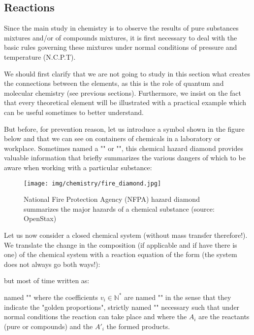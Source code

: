 	\subsection{Reactions}\label{chemical reactions}
	Since the main study in chemistry is to observe the results of pure substances mixtures and/or of compounds mixtures, it is first necessary to deal with  the basic rules governing these mixtures under normal conditions of pressure and temperature (N.C.P.T).
	
	We should first clarify that we are not going to study in this section what creates the connections between the elements, as this is the role of quantum and molecular chemistry (see previous sections). Furthermore, we insist on the fact that every theoretical element will be illustrated with a practical example which can be useful sometimes to better understand.
	
	But before, for prevention reason, let us introduce a symbol shown in the figure below and that we can see on containers of chemicals in a laboratory or workplace. Sometimes named a "" or "", this chemical hazard diamond provides valuable information that briefly summarizes the various dangers of which to be aware when working with a particular
substance:
	\begin{figure}[H]
		\centering
		\texttt{[image: img/chemistry/fire\_diamond.jpg]}
		\caption[National Fire Protection Agency (NFPA) hazard diamond]{National Fire Protection Agency (NFPA) hazard diamond summarizes the major hazards of a chemical substance (source: OpenStax)}
	\end{figure}
	
	Let us now consider a closed chemical system (without mass transfer therefore!). We translate the change in the composition (if applicable and if have there is one) of the chemical system with a reaction equation of the form (the system does not always go both ways!):
	
	but most of time written as:
	
	named "" where the coefficients $v_i \in \mathbb{N}^*$ are named  "" in the sense that they indicate the "golden proportions", strictly named "" necessary such that under normal conditions the reaction can take place and where the $A_i$ are the reactants (pure or compounds) and the ${A'}_i$ the formed products.
	
